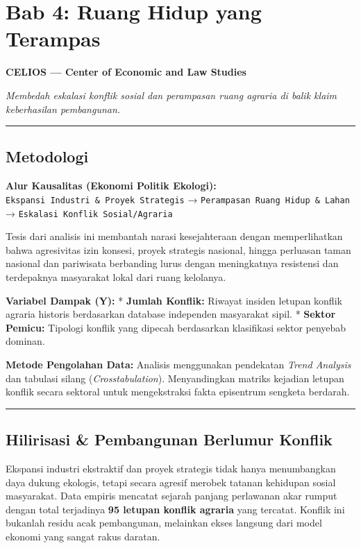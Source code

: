 \documentclass[
]{article}
\author{}
\date{}
\begin{document}
\section{Bab 4: Ruang Hidup yang
Terampas}\label{bab-4-ruang-hidup-yang-terampas}

\textbf{CELIOS --- Center of Economic and Law Studies}

\emph{Membedah eskalasi konflik sosial dan perampasan ruang agraria di
balik klaim keberhasilan pembangunan.}

\begin{center}\rule{0.5\linewidth}{0.5pt}\end{center}

\subsection{Metodologi}\label{metodologi}

\textbf{Alur Kausalitas (Ekonomi Politik Ekologi):}
\texttt{Ekspansi\ Industri\ \&\ Proyek\ Strategis} →
\texttt{Perampasan\ Ruang\ Hidup\ \&\ Lahan} →
\texttt{Eskalasi\ Konflik\ Sosial/Agraria}

Tesis dari analisis ini membantah narasi kesejahteraan dengan
memperlihatkan bahwa agresivitas izin konsesi, proyek strategis
nasional, hingga perluasan taman nasional dan pariwisata berbanding
lurus dengan meningkatnya resistensi dan terdepaknya masyarakat lokal
dari ruang kelolanya.

\textbf{Variabel Dampak (Y):} * \textbf{Jumlah Konflik:} Riwayat insiden
letupan konflik agraria historis berdasarkan database independen
masyarakat sipil. * \textbf{Sektor Pemicu:} Tipologi konflik yang
dipecah berdasarkan klasifikasi sektor penyebab dominan.

\textbf{Metode Pengolahan Data:} Analisis menggunakan pendekatan
\emph{Trend Analysis} dan tabulasi silang (\emph{Crosstabulation}).
Menyandingkan matriks kejadian letupan konflik secara sektoral untuk
mengekstraksi fakta episentrum sengketa berdarah.

\begin{center}\rule{0.5\linewidth}{0.5pt}\end{center}

\subsection{Hilirisasi \& Pembangunan Berlumur
Konflik}\label{hilirisasi-pembangunan-berlumur-konflik}

Ekspansi industri ekstraktif dan proyek strategis tidak hanya
menumbangkan daya dukung ekologis, tetapi secara agresif merobek tatanan
kehidupan sosial masyarakat. Data empiris mencatat sejarah panjang
perlawanan akar rumput dengan total terjadinya \textbf{95 letupan
konflik agraria} yang tercatat. Konflik ini bukanlah residu acak
pembangunan, melainkan ekses langsung dari model ekonomi yang sangat
rakus daratan.
\end{document}
